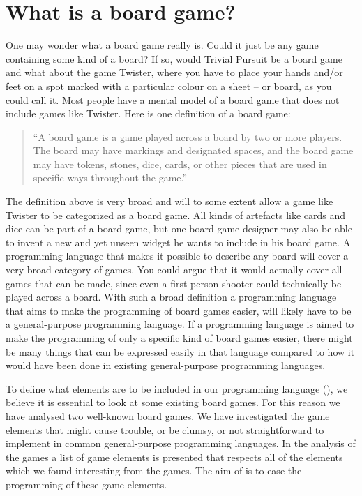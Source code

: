 \section{What is a board game?}
\label{sec:board-game-analysis}

One may wonder what a board game really is. Could it just be any game containing
some kind of a board? If so, would Trivial Pursuit be a board game and what
about the game Twister, where you have to place your hands and/or feet on a spot
marked with a particular colour on a sheet -- or board, as you could call it. Most
people have a mental model of a board game that does not include games like
Twister. Here is one definition of a board game:

\begin{quote}
  ``A board game is a game played across a board by two or more players. The
  board may have markings and designated spaces, and the board game may have
  tokens, stones, dice, cards, or other pieces that are used in specific ways
  throughout the game.''
  \cite{def-board-game}
\end{quote}

The definition above is very broad and will to some extent allow a game like
Twister to be categorized as a board game. All kinds of artefacts like cards and
dice can be part of a board game, but one board game designer may also be able
to invent a new and yet unseen widget he wants to include in his board
game. A programming language that makes it possible to describe any board will
cover a very broad category of games. You could argue that it would actually
cover all games that can be made, since even a first-person shooter could
technically be played across a board. With such a broad definition a
programming language that aims to make the programming of board games easier,
will likely have to be a general-purpose programming language. If a programming
language is aimed to make the programming of only a specific kind of board games
easier, there might be many things that can be expressed easily in that language
compared to how it would have been done in existing general-purpose programming
languages.

To define what elements are to be included in our programming language
(\productname{}), we believe it is essential to look at some existing board
games.  For this reason we have analysed two well-known board games. We have
investigated the game elements that might cause trouble, or be clumsy, or not
straightforward to implement in common general-purpose programming languages. In
the analysis of the games a list of game elements is presented that respects all
of the elements which we found interesting from the games. The aim of
\productname{} is to ease the programming of these game elements.

